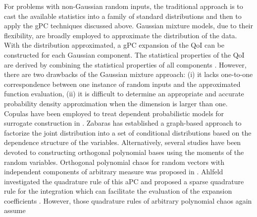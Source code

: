 For problems with non-Gaussian random inputs,
the traditional approach is to cast the available statistics 
into a family of standard distributions and then to apply the \ac{gPC} techniques discussed above.
Gaussian mixture models, due to their flexibility, are broadly employed to approximate 
the distribution of the data. 
With the distribution approximated, a \ac{gPC} expansion of the \ac{QoI} can be constructed for each Gaussian component.
The statistical properties of the \ac{QoI} are derived by combining the statistical properties of all components \cite{LIweixuan2015,Vittaldev2016}.
However, there are two drawbacks of the Gaussian mixture approach: (i) it lacks one-to-one correspondence between one instance of random inputs and the approximated function evaluation, (ii) it is difficult to determine an appropriate and accurate probability density approximation when the dimension is larger than one.
Copulas have been employed to treat dependent probabilistic models for surrogate construction in \cite{FEINBERG2015}.
Zabaras \cite{Zabaras_2014} has established a graph-based approach to factorize the joint distribution into a set of conditional distributions based on the dependence structure of the variables.
Alternatively, several studies have been devoted to constructing orthogonal
polynomial bases using the moments of the random variables. 
Orthogonal polynomial chaos for random vectors with independent components of
arbitrary measure
was proposed in \cite{OLADYSHKIN2012, WanK_SISC06, Witteveen_Bijl_2006, Zheng_2015MEPCM,YIN2018}. 
Ahlfeld investigated the quadrature rule of this \ac{aPC} and proposed 
a sparse quadrature rule for the integration which can facilitate the evaluation of the 
expansion coefficients \cite{AHLFELD2016}. However, those quadrature rules of arbitrary 
polynomial chaos again assume  

